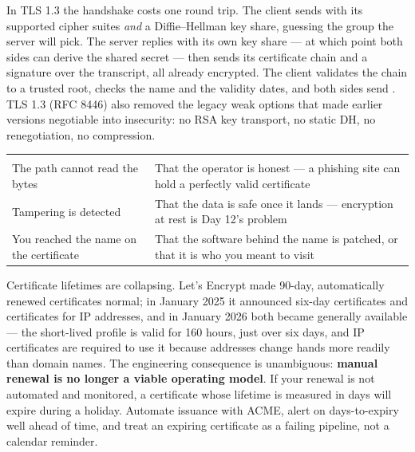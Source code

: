  In TLS 1.3 the handshake costs one round trip. The client sends  with its supported cipher suites \emph{and} a Diffie--Hellman key share, guessing the group the server will pick. The server replies  with its own key share --- at which point both sides can derive the shared secret --- then sends its certificate chain and a  signature over the transcript, all already encrypted. The client validates the chain to a trusted root, checks the name and the validity dates, and both sides send . TLS 1.3 (RFC 8446) also removed the legacy weak options that made earlier versions negotiable into insecurity: no RSA key transport, no static DH, no renegotiation, no compression.

\begin{center}\small
\wbrowcolors
\begin{tabularx}{\linewidth}{@{}L{40mm} X@{}}
 & \\
The path cannot read the bytes & That the operator is honest --- a phishing site can hold a perfectly valid certificate\\
Tampering is detected & That the data is safe once it lands --- encryption at rest is Day 12's problem\\
You reached the name on the certificate & That the software behind the name is patched, or that it is who you meant to visit\\
\end{tabularx}
\end{center}

 Certificate lifetimes are collapsing. Let's Encrypt made 90-day, automatically renewed certificates normal; in January 2025 it announced six-day certificates and certificates for IP addresses, and in January 2026 both became generally available --- the short-lived profile is valid for 160 hours, just over six days, and IP certificates are required to use it because addresses change hands more readily than domain names. The engineering consequence is unambiguous: \textbf{manual renewal is no longer a viable operating model}. If your renewal is not automated and monitored, a certificate whose lifetime is measured in days will expire during a holiday. Automate issuance with ACME, alert on days-to-expiry well ahead of time, and treat an expiring certificate as a failing pipeline, not a calendar reminder.

